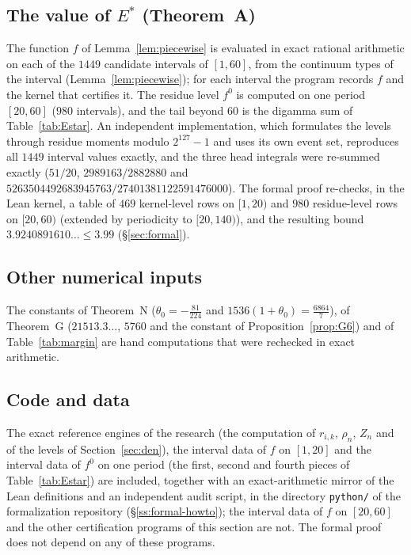 \documentclass{amsart}
\theoremstyle{definition}
\theoremstyle{remark}
\numberwithin{equation}{section}
\begin{document}
\subsection{The value of \texorpdfstring{$E^*$}{E*} (Theorem~A)}\label{ss:comp-E}

The function $f$ of Lemma~\ref{lem:piecewise} is evaluated in exact rational
arithmetic on each of the $1449$ candidate intervals of $[1,60]$, from the
continuum types of the interval (Lemma~\ref{lem:piecewise}); for each interval
the program records $f$ and the kernel that certifies it.
The residue level $f^0$ is computed on one period $[20,60]$ ($980$ intervals),
and the tail beyond $60$ is the digamma sum of Table~\ref{tab:Estar}. An
independent implementation, which formulates the levels through residue
moments modulo $2^{127}-1$ and uses its own event set, reproduces all $1449$
interval values exactly, and the three head integrals were re-summed exactly
($51/20$, $2989163/2882880$ and $5263504492683945763/27401381122591476000$).
The formal proof re-checks, in the Lean kernel, a table of $469$ kernel-level
rows on $[1,20)$ and $980$ residue-level rows on $[20,60)$ (extended by
periodicity to $[20,140)$), and the resulting bound $3.9240891610\ldots\le3.99$
(\S\ref{sec:formal}).

\subsection{Other numerical inputs}\label{ss:comp-other}

The constants of Theorem~N ($\theta_0=-\frac{81}{224}$ and
$1536(1+\theta_0)=\frac{6864}7$), of Theorem~G ($21513.3\ldots$, $5760$ and
the constant of Proposition~\ref{prop:G6}) and of Table~\ref{tab:margin} are
hand computations that were rechecked in exact arithmetic.

\subsection{Code and data}\label{ss:code}

The exact reference engines of the research (the computation of $r_{i,k}$,
$\rho_n$, $Z_n$ and of the levels of Section~\ref{sec:den}), the interval
data of $f$ on $[1,20]$ and the interval data of $f^0$ on one period (the
first, second and fourth pieces of Table~\ref{tab:Estar}) are included,
together with an exact-arithmetic mirror of the Lean definitions and an
independent audit script, in the directory \texttt{python/} of the
formalization repository (\S\ref{ss:formal-howto}); the interval data of $f$
on $[20,60]$ and the other certification programs of this section are not.
The formal proof does not depend on any of these programs.
\end{document}
